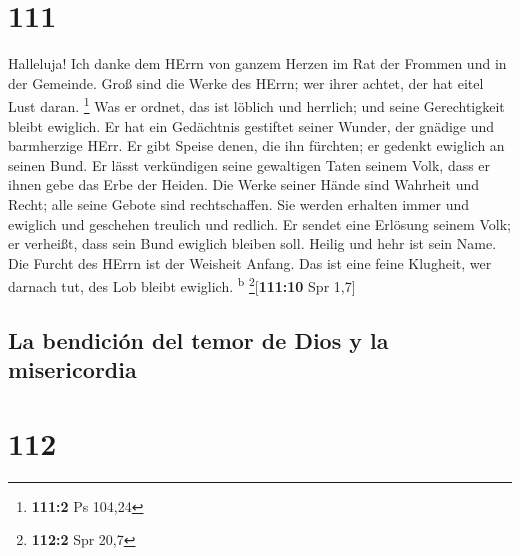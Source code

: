 \hypertarget{section-110}{%
\section{111}\label{section-110}}

 Halleluja! Ich danke dem HErrn von ganzem Herzen im Rat
der Frommen und in der Gemeinde.  Groß sind die Werke des
HErrn; wer ihrer achtet, der hat eitel Lust daran. \footnote{\textbf{111:2}
  Ps 104,24}  Was er ordnet, das ist löblich und herrlich;
und seine Gerechtigkeit bleibt ewiglich.  Er hat ein
Gedächtnis gestiftet seiner Wunder, der gnädige und barmherzige HErr.
 Er gibt Speise denen, die ihn fürchten; er gedenkt
ewiglich an seinen Bund.  Er lässt verkündigen seine
gewaltigen Taten seinem Volk, dass er ihnen gebe das Erbe der Heiden.
 Die Werke seiner Hände sind Wahrheit und Recht; alle
seine Gebote sind rechtschaffen.  Sie werden erhalten
immer und ewiglich und geschehen treulich und redlich.  Er
sendet eine Erlösung seinem Volk; er verheißt, dass sein Bund ewiglich
bleiben soll. Heilig und hehr ist sein Name.  Die Furcht
des HErrn ist der Weisheit Anfang. Das ist eine feine Klugheit, wer
darnach tut, des Lob bleibt ewiglich. \textsuperscript{b}
\footnote{\textbf{112:2} Spr 20,7}{[}\textbf{111:10} Spr 1,7{]}

\hypertarget{la-bendiciuxf3n-del-temor-de-dios-y-la-misericordia}{%
\subsection{La bendición del temor de Dios y la
misericordia}\label{la-bendiciuxf3n-del-temor-de-dios-y-la-misericordia}}

\hypertarget{section-111}{%
\section{112}\label{section-111}}

